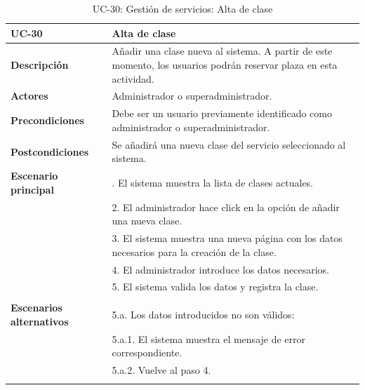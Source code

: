 \begin{table}
  \begin{center}
    \begin{tabularx}{16.4cm}{|l|X|}
      \hline
      \textbf{UC-30} & \textbf{Alta de clase}\\
      \hline
      \textbf{Descripción} & Añadir una clase nueva al sistema. A partir de este momento, los usuarios podrán reservar plaza en esta actividad.\\
      \hline
      \textbf{Actores} & Administrador o superadministrador.\\
      \hline
      \textbf{Precondiciones} & Debe ser un usuario previamente identificado como administrador o superadministrador.\\
      \hline
      \textbf{Postcondiciones} & Se añadirá una nueva clase del servicio seleccionado al sistema.\\
      \hline
      \textbf{Escenario principal} & \smallskip 1. El sistema muestra la lista de clases actuales.\\
      & 2. El administrador hace click en la opción de añadir una nueva clase.\\
      & 3. El sistema muestra una nueva página con los datos necesarios para la creación de la clase.\\
      & 4. El administrador introduce los datos necesarios.\\
      & 5. El sistema valida los datos y registra la clase.\\
      & \\
      \hline
      \textbf{Escenarios alternativos} & \smallskip 5.a. Los datos introducidos no son válidos:\\
      & \hspace{0.3cm} 5.a.1. El sistema muestra el mensaje de error correspondiente.\\
      & \hspace{0.3cm} 5.a.2. Vuelve al paso 4.\\
      & \\
      \hline
    \end{tabularx}
    \caption{UC-30: Gestión de servicios: Alta de clase}
    \label{tab:CU-alta-clase}
  \end{center}
\end{table}


